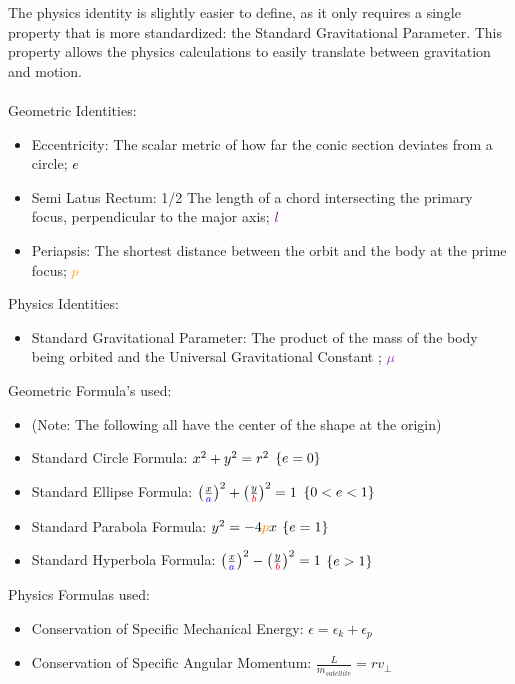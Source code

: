     The physics identity is slightly easier to define, as it only requires a single property that is more standardized: the Standard Gravitational Parameter. This property allows the physics calculations to easily translate between gravitation and motion.
\\\\    
Geometric Identities:
\begin{itemize}
    \item Eccentricity: The scalar metric of how far the conic section deviates from a circle; \textcolor{black}{$e$}
    \item Semi Latus Rectum: 1/2 The length of a chord intersecting the primary focus, perpendicular to the major axis; \textcolor{purple}{$l$} 
    \item Periapsis: The shortest distance between the orbit and the body at the prime focus; \textcolor{orange}{$p$}
\end{itemize}
Physics Identities:
\begin{itemize}
    \item Standard Gravitational Parameter: The product of the mass of the body being orbited and the Universal Gravitational Constant ; \textcolor{DarkOrchid}{$\mu$}\\
\end{itemize}
Geometric Formula's used:
\begin{itemize}
    \item[] (Note: The following all have the center of the shape at the origin)
    \item Standard Circle Formula: $x^2 + y^2 = \textcolor{black}{r}^2$   $\{\textcolor{black}{e}=0\}$
    \item Standard Ellipse Formula: $\left(\frac{x}{\textcolor{blue}{a}}\right)^2 + \left(\frac{y}{\textcolor{red}{b}}\right)^2 = 1$   $\{0<\textcolor{black}{e}<1 \}$
    \item Standard Parabola Formula: $y^2=-4\textcolor{orange}{p}x$ $\{\textcolor{black}{e}=1\}$
    \item Standard Hyperbola Formula: $\left(\frac{x}{\textcolor{blue}{a}}\right)^2 - \left(\frac{y}{\textcolor{red}{b}}\right)^2 = 1$   $\{\textcolor{black}{e}>1 \}$\\
\end{itemize}
Physics Formulas used:
\begin{itemize}
    \item Conservation of Specific Mechanical Energy: $\epsilon=\epsilon_k+\epsilon_p$
    \item Conservation of Specific Angular Momentum:
    $\frac{L}{m_{satellite}}=rv_\perp$
\end{itemize}

